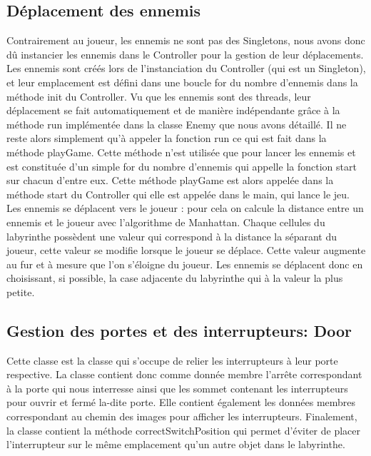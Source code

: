 \documentclass [10pt, a4paper]{article}
\begin{document}
\subsection {Déplacement des ennemis}
Contrairement au joueur, les ennemis ne sont pas des Singletons, nous avons donc dû instancier les ennemis dans le Controller pour la gestion de leur déplacements. Les ennemis sont créés lors de l'instanciation du Controller (qui est un Singleton), et leur emplacement est défini dans une boucle for du nombre d'ennemis dans la méthode init du Controller. Vu que les ennemis sont des threads, leur déplacement se fait automatiquement et de manière indépendante grâce à la méthode run implémentée dans la classe Enemy que nous avons détaillé. Il ne reste alors simplement qu'à appeler la fonction run ce qui est fait dans la méthode playGame. Cette méthode n'est utilisée que pour lancer les ennemis et est constituée d'un simple for du nombre d'ennemis qui appelle la fonction start sur chacun d'entre eux. Cette méthode playGame est alors appelée dans la méthode start du Controller qui elle est appelée dans le main, qui lance le jeu. 
Les ennemis se déplacent vers le joueur : pour cela on calcule la distance entre un ennemis et le joueur avec l'algorithme de Manhattan. Chaque cellules du labyrinthe possèdent une valeur qui correspond à la distance la séparant du joueur, cette valeur se modifie lorsque le joueur se déplace. Cette valeur augmente au fur et à mesure que l'on s'éloigne du joueur. Les ennemis se déplacent donc en choisissant, si possible, la case adjacente du labyrinthe qui à la valeur la plus petite.


\subsection {Gestion des portes et des interrupteurs: Door}
Cette classe est la classe qui s'occupe de relier les interrupteurs à leur porte respective. La classe contient donc comme donnée membre l'arrête correspondant à la porte qui nous interresse ainsi que les sommet contenant les interrupteurs pour ouvrir et fermé la-dite porte. Elle contient également les données membres correspondant au chemin des images pour afficher les interrupteurs. Finalement, la classe contient la méthode correctSwitchPosition qui permet d'éviter de placer l'interrupteur sur le même emplacement qu'un autre objet dans le labyrinthe.
\end{document}
